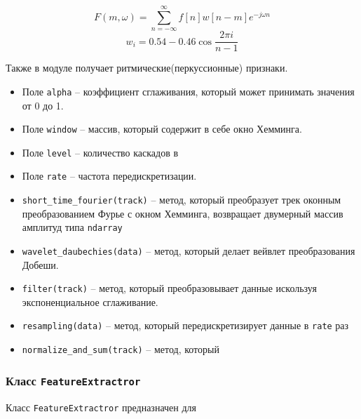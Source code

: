 \begin{equation}\label{eq:stft}
F(m, \omega) = \sum \limits_{n=-\infty}^{\infty} f[n]w[n-m]e^{-j \omega n} 
\end{equation}
\begin{equation}\label{eq:window}
w_i = 0.54 - 0.46 \cos\frac{2\pi i}{n-1}
\end{equation}

Также в модуле получает ритмические(перкуссионные) признаки. 

\begin{itemize}
\item{Поле \texttt{alpha} -- коэффициент сглаживания, который может принимать значения от 0 до 1.}
\item{Поле \texttt{window} -- массив, который содержит в себе окно Хемминга.}
\item{Поле \texttt{level} -- количество каскадов в }
\item{Поле \texttt{rate} -- частота передискретизации.}
\item{\texttt{short\_time\_fourier(track)} -- метод, который преобразует трек оконным преобразованием Фурье с окном Хемминга, возвращает двумерный массив амплитуд типа \texttt{ndarray} }
\item{\texttt{wavelet\_daubechies(data)} -- метод, который  делает вейвлет преобразования Добеши. }
\item{\texttt{filter(track)} -- метод, который преобразовывает данные искользуя экспоненциальное сглаживание.}
\item{\texttt{resampling(data)} -- метод, который передискретизирует данные в \texttt{rate} раз }
\item{\texttt{normalize\_and\_sum(track)} -- метод, который}
\end{itemize}

\subsubsection{Класс \texttt{FeatureExtractror}}

Класс \texttt{FeatureExtractror} предназначен для

